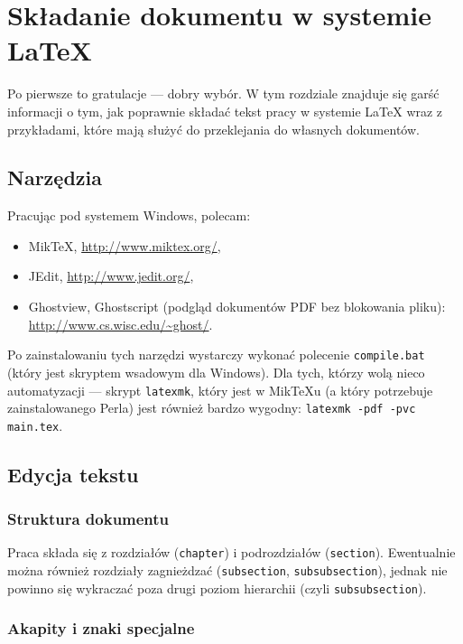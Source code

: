 
\chapter{Składanie dokumentu w systemie \LaTeX}

Po pierwsze to gratulacje --- dobry wybór. W tym rozdziale znajduje się
garść informacji o tym, jak poprawnie składać tekst pracy w systemie \LaTeX{} wraz z 
przykładami, które mają służyć do przeklejania do własnych dokumentów.

\section{Narzędzia}
Pracując pod systemem Windows, polecam:
\begin{itemize}
    \item MikTeX, \url{http://www.miktex.org/},
    \item JEdit, \url{http://www.jedit.org/},
    \item Ghostview, Ghostscript (podgląd dokumentów PDF bez blokowania pliku):\\
        \url{http://www.cs.wisc.edu/~ghost/}. 
\end{itemize}

Po zainstalowaniu tych narzędzi wystarczy wykonać polecenie \texttt{compile.bat} (który
jest skryptem wsadowym dla Windows). Dla tych, którzy wolą nieco automatyzacji --- skrypt
\texttt{latexmk}, który jest w MikTeXu (a który potrzebuje zainstalowanego Perla) jest
również bardzo wygodny: \texttt{latexmk -pdf -pvc main.tex}.

\section{Edycja tekstu}

\subsection{Struktura dokumentu}

Praca składa się z rozdziałów (\texttt{chapter}) i podrozdziałów (\texttt{section}).
Ewentualnie można również rozdziały zagnieżdzać (\texttt{subsection}, \texttt{subsubsection}),
jednak nie powinno się wykraczać poza drugi poziom hierarchii (czyli \texttt{subsubsection}).

\subsection{Akapity i znaki specjalne}

